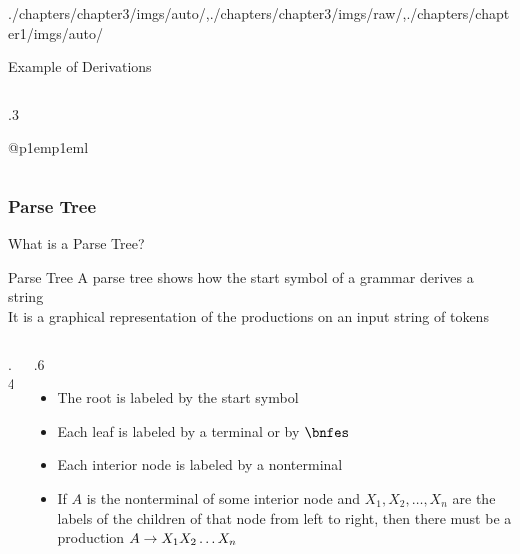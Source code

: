 \begin{graphicspathcontext}{{./chapters/chapter3/imgs/auto/},{./chapters/chapter3/imgs/raw/},{./chapters/chapter1/imgs/auto/}}
\begin{bibunit}[apalike]
\begin{frame}[t]{Example of Derivations}
\begin{columns}
\begin{column}[t]{.3\linewidth}
\begin{tabular}[t]{@{}p{1em}p{1em}l}
				\only<4->{& \derivrm & $\bnfpn{E} \bnfts{+} \bnfts{id} \bnfts{*} \bnfts{id}$ \\}
				\only<5->{& \derivrm & $\bnfts{id} \bnfts{+} \bnfts{id} \bnfts{*} \bnfts{id}$ \\}
			\end{tabular}
		\end{column}
	\end{columns}
\end{frame}

\subsubsection{Parse Tree}
\subsubsectiontableofcontentslide

\begin{frame}{{What is a} Parse Tree?}
	\begin{definitionblock}{Parse Tree}
	A parse tree shows how the start symbol of a grammar derives a string \\
	It is a graphical representation of the productions on an input string of tokens
	\end{definitionblock}
	\begin{columns}
		\begin{column}{.4\linewidth}
		\end{column}
		\begin{column}{.6\linewidth}
			\begin{itemize}
				\item The root is labeled by the start symbol
				\item Each leaf is labeled by a terminal or by $\bnfes$
				\item Each interior node is labeled by a nonterminal
				\item If $A$ is the nonterminal of some interior node and $X_1, X_2, \dots, X_n$ are the labels of the children of that node from left to right, then there must be a production $A \rightarrow X_1 X_2 \dots X_n$
			\end{itemize}
		\end{column}
	\end{columns}
	\vspace{.5cm}
\end{frame}


\end{bibunit}
\end{graphicspathcontext}

